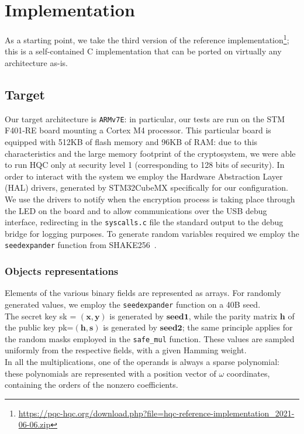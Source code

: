 \section{Implementation}
As a starting point, we take the third version of the reference implementation\footnote{\href{https://pqc-hqc.org/download.php?file=hqc-reference-implementation\_2021-06-06.zip}{https://pqc-hqc.org/download.php?file=hqc-reference-implementation\_2021-06-06.zip}}; this is a self-contained C implementation that can be ported on virtually any architecture as-is.

\subsection*{\textbf{Target}}
Our target architecture is \texttt{ARMv7E}: in particular, our tests are run on the STM F401-RE board mounting a Cortex\textsuperscript{\textregistered} M4 processor. This particular board is equipped with 512KB of flash memory and 96KB of RAM: due to this characteristics and the large memory footprint of the cryptosystem, we were able to run HQC only at security level 1 (corresponding to 128 bits of security).
In order to interact with the system we employ the Hardware Abstraction Layer (HAL) drivers, generated by STM32CubeMX specifically for our configuration. We use the drivers to notify when the encryption process is taking place through the LED on the board and to allow communications over the USB debug interface, redirecting in the \texttt{syscalls.c} file the standard output to the debug bridge for logging purposes.
To generate random variables required we employ the \texttt{seedexpander} function from SHAKE256~\cite{dworkin2015sha}.

\subsubsection*{\textbf{Objects representations}}
Elements of the various binary fields are represented as arrays. For randomly generated values, we employ the \texttt{seedexpander} function on a 40B seed.\\
The secret key \textsf{sk} = $(\mathbf{x}, \mathbf{y})$ is generated by $\mathbf{seed1}$, while the parity matrix $\mathbf{h}$ of the public key \textsf{pk}=$(\mathbf{h}, \mathbf{s})$ is generated by $\mathbf{seed2}$; the same principle applies for the random masks employed in the \texttt{safe\_mul} function. These values are sampled uniformly from the respective fields, with a given Hamming weight.\\
In all the multiplications, one of the operands is always a sparse polynomial: these polynomials are represented with a position vector of $\omega$ coordinates, containing the orders of the nonzero coefficients.

